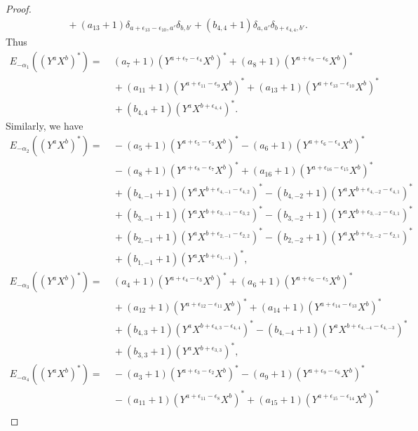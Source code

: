 \documentclass[12pt]{article}
\numberwithin{equation}{section}
\theoremstyle{definition}
\theoremstyle{remark}
\begin{document}
\begin{proof}
\begin{align}
		&\:+(a_{13}+1)\delta_{a+\epsilon_{13}-\epsilon_{10},a'}\delta_{b,b'}+(b_{4,4}+1)\delta_{a,a'}\delta_{b+\epsilon_{4,4},b'}.
	\end{align}
	Thus
	\begin{align}
		E_{-\alpha_1}((Y^aX^b)^*)=&\:(a_7+1)(Y^{a+\epsilon_7-\epsilon_4}X^{b})^*+(a_8+1)(Y^{a+\epsilon_8-\epsilon_6}X^b)^*\nonumber\\
		&\:+(a_{11}+1)(Y^{a+\epsilon_{11}-\epsilon_9}X^{b})^*+(a_{13}+1)(Y^{a+\epsilon_{13}-\epsilon_{10}}X^{b})^*\nonumber\\
		&\:+(b_{4,4}+1)(Y^{a}X^{b+\epsilon_{4,4}})^*.\label{al1}
	\end{align}
	Similarly, we have
	\begin{align}
		E_{-\alpha_2}((Y^aX^b)^*)=&\:-(a_5+1)(Y^{a+\epsilon_5-\epsilon_3}X^{b})^*-(a_6+1)(Y^{a+\epsilon_6-\epsilon_4}X^{b})^*\nonumber\\
		&\:-(a_8+1)(Y^{a+\epsilon_8-\epsilon_7}X^{b})^*+(a_{16}+1)(Y^{a+\epsilon_{16}-\epsilon_{15}}X^{b})^*\nonumber\\
		&\:+(b_{4,-1}+1)(Y^aX^{b+\epsilon_{4,-1}-\epsilon_{4,2}})^*-(b_{4,-2}+1)(Y^aX^{b+\epsilon_{4,-2}-\epsilon_{4,1}})^*\nonumber\\
		&\:+(b_{3,-1}+1)(Y^aX^{b+\epsilon_{3,-1}-\epsilon_{3,2}})^*-(b_{3,-2}+1)(Y^aX^{b+\epsilon_{3,-2}-\epsilon_{3,1}})^*\nonumber\\
		&\:+(b_{2,-1}+1)(Y^aX^{b+\epsilon_{2,-1}-\epsilon_{2,2}})^*-(b_{2,-2}+1)(Y^aX^{b+\epsilon_{2,-2}-\epsilon_{2,1}})^*\nonumber\\
		&\:+(b_{1,-1}+1)(Y^aX^{b+\epsilon_{1,-1}})^*,\label{al2}
	\end{align}
	\begin{align}
		E_{-\alpha_3}((Y^aX^b)^*)\nonumber=&\:(a_4+1)(Y^{a+\epsilon_4-\epsilon_3}X^{b})^*+(a_6+1)(Y^{a+\epsilon_6-\epsilon_5}X^{b})^*\nonumber\\
		&\:+(a_{12}+1)(Y^{a+\epsilon_{12}-\epsilon_{11}}X^{b})^*+(a_{14}+1)(Y^{a+\epsilon_{14}-\epsilon_{13}}X^{b})^*\nonumber\\
		&\:+(b_{4,3}+1)(Y^aX^{b+\epsilon_{4,3}-\epsilon_{4,4}})^*-(b_{4,-4}+1)(Y^aX^{b+\epsilon_{4,-4}-\epsilon_{4,-3}})^*\nonumber\\
		&\:+(b_{3,3}+1)(Y^aX^{b+\epsilon_{3,3}})^*,
	\end{align}
	\begin{align}
		E_{-\alpha_4}((Y^aX^b)^*)\nonumber=&\:-(a_3+1)(Y^{a+\epsilon_3-\epsilon_2}X^{b})^*-(a_9+1)(Y^{a+\epsilon_9-\epsilon_6}X^{b})^*\nonumber\\
		&\:-(a_{11}+1)(Y^{a+\epsilon_{11}-\epsilon_8}X^{b})^*+(a_{15}+1)(Y^{a+\epsilon_{15}-\epsilon_{14}}X^{b})^*\nonumber\\

\end{align}
\end{proof}
\end{document}
